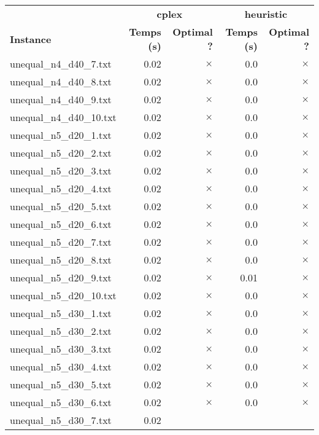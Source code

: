 \documentclass{article}
\begin{document}
\newpage
\begin{center}
\renewcommand{\arraystretch}{1.4} 
 \begin{tabular}{lrrrr}
	\hline
 & \multicolumn{2}{c}{\textbf{cplex}} & \multicolumn{2}{c}{\textbf{heuristic}}\\
\textbf{Instance}  & \textbf{Temps (s)} & \textbf{Optimal ?}  & \textbf{Temps (s)} & \textbf{Optimal ?} \\\hline

unequal\_n4\_d40\_7.txt & 0.02 & 
$\times$
 & 0.0 & 
$\times$
\\
unequal\_n4\_d40\_8.txt & 0.02 & 
$\times$
 & 0.0 & 
$\times$
\\
unequal\_n4\_d40\_9.txt & 0.02 & 
$\times$
 & 0.0 & 
$\times$
\\
unequal\_n4\_d40\_10.txt & 0.02 & 
$\times$
 & 0.0 & 
$\times$
\\
unequal\_n5\_d20\_1.txt & 0.02 & 
$\times$
 & 0.0 & 
$\times$
\\
unequal\_n5\_d20\_2.txt & 0.02 & 
$\times$
 & 0.0 & 
$\times$
\\
unequal\_n5\_d20\_3.txt & 0.02 & 
$\times$
 & 0.0 & 
$\times$
\\
unequal\_n5\_d20\_4.txt & 0.02 & 
$\times$
 & 0.0 & 
$\times$
\\
unequal\_n5\_d20\_5.txt & 0.02 & 
$\times$
 & 0.0 & 
$\times$
\\
unequal\_n5\_d20\_6.txt & 0.02 & 
$\times$
 & 0.0 & 
$\times$
\\
unequal\_n5\_d20\_7.txt & 0.02 & 
$\times$
 & 0.0 & 
$\times$
\\
unequal\_n5\_d20\_8.txt & 0.02 & 
$\times$
 & 0.0 & 
$\times$
\\
unequal\_n5\_d20\_9.txt & 0.02 & 
$\times$
 & 0.01 & 
$\times$
\\
unequal\_n5\_d20\_10.txt & 0.02 & 
$\times$
 & 0.0 & 
$\times$
\\
unequal\_n5\_d30\_1.txt & 0.02 & 
$\times$
 & 0.0 & 
$\times$
\\
unequal\_n5\_d30\_2.txt & 0.02 & 
$\times$
 & 0.0 & 
$\times$
\\
unequal\_n5\_d30\_3.txt & 0.02 & 
$\times$
 & 0.0 & 
$\times$
\\
unequal\_n5\_d30\_4.txt & 0.02 & 
$\times$
 & 0.0 & 
$\times$
\\
unequal\_n5\_d30\_5.txt & 0.02 & 
$\times$
 & 0.0 & 
$\times$
\\
unequal\_n5\_d30\_6.txt & 0.02 & 
$\times$
 & 0.0 & 
$\times$
\\
unequal\_n5\_d30\_7.txt & 0.02 & 

\end{tabular}
\end{center}
\end{document}
